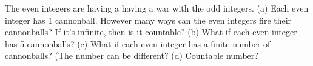 The even integers are having a having a war with the odd integers.
(a) Each even integer has 1 cannonball.
However many ways can the even integers fire their cannonballs?
If it's infinite, then is it countable?
(b) What if each even integer has 5 cannonballs?
(c) What if each even integer has a finite number of cannonballs?
(The number can be different?
(d) Countable number?
